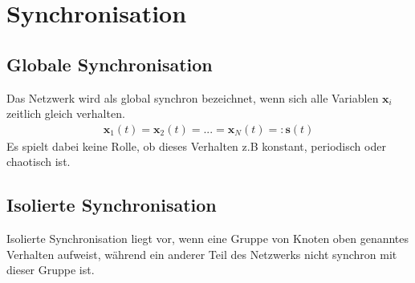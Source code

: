 \section{Synchronisation}
\subsection{Globale Synchronisation}
Das Netzwerk wird als global synchron bezeichnet, wenn sich alle Variablen $\boldsymbol{x}_i$ zeitlich gleich verhalten.
\begin{align*}
\boldsymbol{x}_1(t)=\boldsymbol{x}_2(t)=...=\boldsymbol{x}_N(t)=:\boldsymbol{s}(t)
\end{align*}
Es spielt dabei keine Rolle, ob dieses Verhalten z.B konstant, periodisch oder chaotisch ist.

\subsection{Isolierte Synchronisation}
Isolierte Synchronisation liegt vor, wenn eine Gruppe von Knoten oben genanntes Verhalten aufweist, während ein anderer Teil des Netzwerks nicht synchron mit dieser Gruppe ist.

